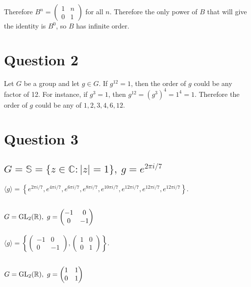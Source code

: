 \documentclass[a4paper]{article}
\begin{document}
Therefore $B^n = \begin{pmatrix} 1 & n\\ 0 & 1 \end{pmatrix}$ for all $n$. Therefore the only power of $B$ that will give the identity is $B^0$, so $B$ has infinite order.


\section*{Question 2}

Let $G$ be a group and let $g \in G$. If $g^{12} = 1$, then the order of $g$ could be any factor of 12. For instance, if $g^3 = 1$, then $g^{12} = \left(g^3\right)^4 = 1^4 = 1$. Therefore the order of $g$ could be any of $1, 2, 3, 4, 6, 12$.


\section*{Question 3}
\setcounter{section}{3}
\setcounter{subsection}{0}

\subsection{$G = \mathbb S = \{z \in \mathbb C : |z| = 1\},\ g = e^{2 \pi i / 7}$}

$\langle g \rangle = \left\{ e^{2 \pi i / 7}, e^{4 \pi i / 7}, e^{6 \pi i / 7}, e^{8 \pi i / 7}, e^{10 \pi i / 7}, e^{12 \pi i / 7}, e^{12 \pi i / 7}, e^{12 \pi i / 7} \right\}$.

\subsection{$G = \text{\normalfont GL}_2(\mathbb R),\ g = \begin{pmatrix} -1 & 0\\ 0 & -1 \end{pmatrix}$}

$\langle g \rangle = \left\{ \begin{pmatrix}-1 & 0\\ 0 & -1\end{pmatrix}, \begin{pmatrix}1 & 0\\ 0 & 1\end{pmatrix} \right\}$.

\subsection{$G = \text{\normalfont GL}_2(\mathbb R),\ g = \begin{pmatrix} 1 & 1\\ 0 & 1 \end{pmatrix}$}
\end{document}
